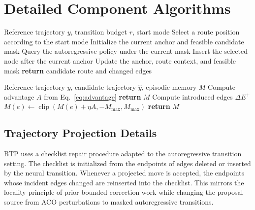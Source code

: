\documentclass[11pt]{article}
\newcommand{\BTP}{\textsc{BTP}}
\newcommand{\EAM}{\textsc{EAM}}
\newcommand{\clip}{\operatorname{clip}}
\begin{document}
\newpage
\appendix

\section{Detailed Component Algorithms}

\begin{algorithm}[h]
\caption{Context-preserving transition.}
\label{alg:cpp}
\small
\begin{algorithmic}[1]
\REQUIRE Reference trajectory $y$, transition budget $r$, start mode
\STATE Select a route position according to the start mode
\STATE Initialize the current anchor and feasible candidate mask
    \STATE Query the autoregressive policy under the current mask
    \STATE Insert the selected node after the current anchor
    \STATE Update the anchor, route context, and feasible mask
\ENDWHILE
\STATE \textbf{return} candidate route and changed edges
\end{algorithmic}
\end{algorithm}

\begin{algorithm}[h]
\caption{\EAM{} update for one projected proposal.}
\label{alg:eam}
\small
\begin{algorithmic}[1]
\REQUIRE Reference trajectory $y$, candidate trajectory $\hat y$, episodic memory $M$
\STATE Compute advantage $A$ from Eq.~\eqref{eq:advantage}
    \STATE \textbf{return} $M$
\ENDIF
\STATE Compute introduced edges $\Delta E^+$
    \STATE $M(e)\leftarrow\clip(M(e)+\eta A,-M_{\max},M_{\max})$
\ENDFOR
\STATE \textbf{return} $M$
\end{algorithmic}
\end{algorithm}

\subsection{Trajectory Projection Details}
\label{app:btp-details}

\BTP{} uses a checklist repair procedure adapted to the autoregressive transition setting. The checklist is initialized from the endpoints of edges deleted or inserted by the neural transition. Whenever a projected move is accepted, the endpoints whose incident edges changed are reinserted into the checklist. This mirrors the locality principle of prior bounded correction work \citep{dynaco} while changing the proposal source from ACO perturbations to masked autoregressive transitions.
\end{document}
